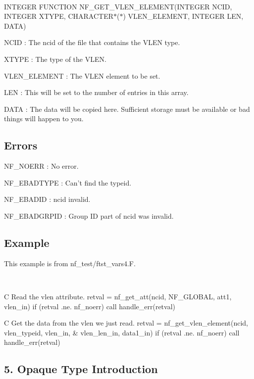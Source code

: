  

I\+N\+T\+E\+G\+ER F\+U\+N\+C\+T\+I\+ON N\+F\+\_\+\+G\+E\+T\+\_\+\+V\+L\+E\+N\+\_\+\+E\+L\+E\+M\+E\+NT(I\+N\+T\+E\+G\+ER N\+C\+ID, I\+N\+T\+E\+G\+ER X\+T\+Y\+PE, C\+H\+A\+R\+A\+C\+T\+E\+R$\ast$($\ast$) V\+L\+E\+N\+\_\+\+E\+L\+E\+M\+E\+NT, I\+N\+T\+E\+G\+ER L\+EN, D\+A\+TA)

{\ttfamily N\+C\+ID} \+: The ncid of the file that contains the V\+L\+EN type.

{\ttfamily X\+T\+Y\+PE} \+: The type of the V\+L\+EN.

{\ttfamily V\+L\+E\+N\+\_\+\+E\+L\+E\+M\+E\+NT} \+: The V\+L\+EN element to be set.

{\ttfamily L\+EN} \+: This will be set to the number of entries in this array.

{\ttfamily D\+A\+TA} \+: The data will be copied here. Sufficient storage must be available or bad things will happen to you.

\subsection*{Errors }

{\ttfamily N\+F\+\_\+\+N\+O\+E\+RR} \+: No error.

{\ttfamily N\+F\+\_\+\+E\+B\+A\+D\+T\+Y\+PE} \+: Can’t find the typeid.

{\ttfamily N\+F\+\_\+\+E\+B\+A\+D\+ID} \+: ncid invalid.

{\ttfamily N\+F\+\_\+\+E\+B\+A\+D\+G\+R\+P\+ID} \+: Group ID part of ncid was invalid.

\subsection*{Example }

This example is from nf\+\_\+test/ftst\+\_\+vars4.\+F.

 

C Read the vlen attribute. retval = nf\+\_\+get\+\_\+att(ncid, N\+F\+\_\+\+G\+L\+O\+B\+AL, \textquotesingle{}att1\textquotesingle{}, vlen\+\_\+in) if (retval .ne. nf\+\_\+noerr) call handle\+\_\+err(retval)

C Get the data from the vlen we just read. retval = nf\+\_\+get\+\_\+vlen\+\_\+element(ncid, vlen\+\_\+typeid, vlen\+\_\+in, \& vlen\+\_\+len\+\_\+in, data1\+\_\+in) if (retval .ne. nf\+\_\+noerr) call handle\+\_\+err(retval)

\subsection*{5. Opaque Type Introduction }


